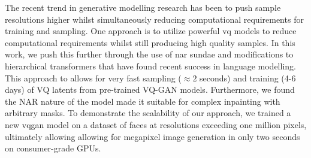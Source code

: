 

The recent trend in generative modelling research has been to push sample
resolutions higher whilst simultaneously reducing computational requirements for
training and sampling. One approach is to utilize powerful \acrfull{vq}
models to reduce computational requirements whilst still producing high
quality samples. In this work, we push this further through the use of
\acrfull{nar} \acrfull{sundae} and modifications to hierarchical transformers
that have found recent success in language modelling. This approach to allows
for very fast sampling ($\approx 2$ seconds) and training (4-6 days) of VQ
latents from pre-trained VQ-GAN models. Furthermore, we found the NAR nature of
the model made it suitable for complex inpainting with arbitrary masks. To
demonstrate the scalability of our approach, we trained a new \gls{vqgan} model
on a dataset of faces at resolutions exceeding one million pixels, ultimately
allowing allowing for megapixel image generation in only two seconds on
consumer-grade GPUs.

